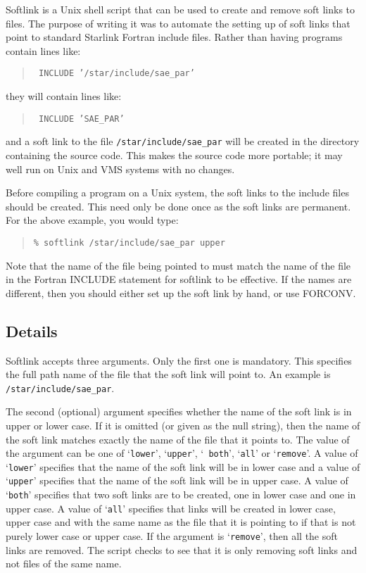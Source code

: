 Softlink is a Unix shell script that can be used to create and remove soft
links to files. The purpose of writing it was to automate the setting up of
soft links that point to standard Starlink Fortran include files.  Rather than
having programs contain lines like:

\begin{quote}{\tt
INCLUDE '/star/include/sae\_par'
}
\end{quote}

they will contain lines like:

\begin{quote}{\tt
INCLUDE 'SAE\_PAR'
}
\end{quote}

and a soft link to the file {\tt /star/include/sae\_par} will be created in the
directory containing the source code. This makes the source code more portable;
it may well run on Unix and VMS systems with no changes.

Before compiling a program on a Unix system, the soft links to the include
files should be created. This need only be done once as the soft links are
permanent. For the above example, you would type:

\begin{quote}
{\tt \% softlink /star/include/sae\_par upper}
\end{quote}

Note that the name of the file being pointed to must match the name of the file
in the Fortran INCLUDE statement for softlink to be effective. If the names are
different, then you should either set up the soft link by hand, or use FORCONV.

\subsection{Details}

Softlink accepts three arguments. Only the first one is mandatory. This
specifies the full path name of the file that the soft link will point to.
An example is {\tt /star/include/sae\_par}.

The second (optional) argument specifies whether the name of the soft link is
in upper or lower case. If it is omitted (or given as the null string), then
the name of the soft link matches exactly the name of the file that it points
to. The value of the argument can be one of `{\tt lower}', `{\tt upper}', `{\tt 
both}', `{\tt all}' or `{\tt remove}'. A value of `{\tt lower}' specifies that
the name of the soft link will be in lower case and a value of `{\tt upper}'
specifies that the name of the soft link will be in upper case. A value of
`{\tt both}' specifies that two soft links are to be created, one in lower case
and one in upper case. A value of `{\tt all}' specifies that links will be
created in lower case, upper case and with the same name as the file that it is
pointing to if that is not purely lower case or upper case. If the argument is
`{\tt remove}', then all the soft links are removed. The script checks to see
that it is only removing soft links and not files of the same name.

